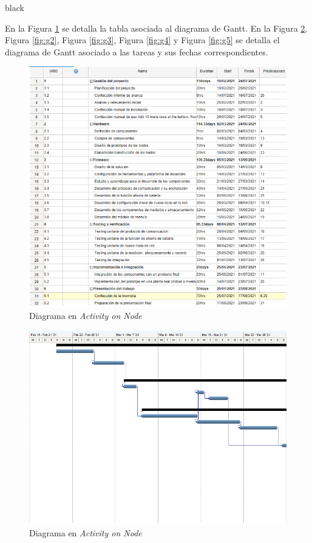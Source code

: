 \documentclass[11pt]{charter}
\begin{document}
\begin{consigna}{black}

En la Figura \ref{fig:wbs} se detalla la tabla asociada al diagrama de Gantt. En la Figura \ref{fig:g1}, Figura \ref{fig:g2}, Figura \ref{fig:g3}, Figura \ref{fig:g4} y Figura \ref{fig:g5} se detalla el diagrama de Gantt asociado a las tareas y sus fechas correspondientes.

\begin{figure}[htpb]
\centering 
\includegraphics[width=.9\textwidth]{./Figuras/wbs.PNG}
\caption{Diagrama en \textit{Activity on Node}}
\label{fig:wbs}
\end{figure}

\begin{figure}[htpb]
\centering 
\includegraphics[width=.9\textwidth]{./Figuras/c1.PNG}
\caption{Diagrama en \textit{Activity on Node}}
\label{fig:g1}
\end{figure}


\end{consigna}
\end{document}
